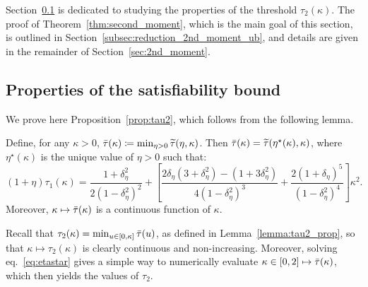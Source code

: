 Section~\ref{subsec:proof_properties_tau2} is dedicated to studying the properties of the threshold $\tau_2(\kappa)$. 
The proof of Theorem~\ref{thm:second_moment}, which is the main goal of this section, is outlined in Section~\ref{subsec:reduction_2nd_moment_ub},
and details are given in the remainder of Section~\ref{sec:2nd_moment}.

\subsection{Properties of the satisfiability bound}\label{subsec:proof_properties_tau2}

We prove here Proposition~\ref{prop:tau2}, which follows from the following lemma.
\begin{lemma}\label{lemma:tau2_prop}
    Define, for any $\kappa > 0$, ${\bar{\tau}}(\kappa) \coloneqq \min_{\eta > 0} {\widetilde{\tau}}(\eta, \kappa)$.
    Then ${\bar{\tau}}(\kappa) = {\widetilde{\tau}}(\eta^\star(\kappa),\kappa)$,
where
$\eta^\star(\kappa)$ is the unique value of $\eta > 0$ such that:
\begin{equation}
    \label{eq:etastar}
      (1+\eta) \tau_1(\kappa) = \frac{1+\delta_{\eta}^2}{2(1-\delta_{\eta}^2)^2}
    + \left[\frac{2 \delta_{\eta} (3+\delta_{\eta}^2) - (1+3 \delta_\eta^2)}{4(1-\delta_{\eta}^2)^3} + \frac{2(1+\delta_{\eta})^5}{(1-\delta_{\eta}^2)^4}\right] \kappa^2.
\end{equation}
Moreover, $\kappa \mapsto {\bar{\tau}}(\kappa)$ is a continuous function of $\kappa$.
\end{lemma}
\noindent
Recall that $\tau_2(\kappa) = \min_{u \in [0,\kappa]} {\bar{\tau}}(u)$, as defined in Lemma~\ref{lemma:tau2_prop}, 
so that $\kappa \mapsto \tau_2(\kappa)$ is clearly continuous and non-increasing.
Moreover, solving eq.~\eqref{eq:etastar} gives a simple way to numerically evaluate $\kappa \in [0,2] \mapsto {\bar{\tau}}(\kappa)$, which then yields the values of $\tau_2$.

